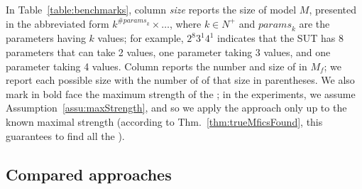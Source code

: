 \begin{tikzborder}{\cite{Gargantini16:validation}}
\begin{tikzborder}{\cite{gargantini_combinatorial_2017}}
\begin{tikzborder}{\cite{gargantini_combinatorial_2017}}
\begin{tikzborder}{\cite{garn2019}}
\begin{tikzborder}{\cite{arcaini2019achieving}}
\begin{tikzborder}{}
In Table~\ref{table:benchmarks}, column \textit{size} reports the size of model $M$, presented in the abbreviated form $k^{\# \mathit{params}_k} \times \ldots$, where $k$$\in$$N^+$ and $\mathit{params}_k$ are the parameters having $k$ values; for example, $2^8$$3^1$$4^1$ indicates that the SUT has 8 parameters that can take 2 values, one parameter taking 3 values, and one parameter taking 4 values. Column \trueMficsSet reports the number and size of \truemfics in $M_f$; we report each possible size with the number of \mfics of that size in parentheses. We also mark in bold face the maximum strength of the \truemfic; in the experiments, we assume Assumption~\ref{assu:maxStrength}, and so we apply the approach only up to the known maximal strength (according to Thm.~\ref{thm:trueMficsFound}, this guarantees to find all the \mfics).
\end{tikzborder}

\subsection{Compared approaches}\label{sec:processes}


\end{tikzborder}
\end{tikzborder}
\end{tikzborder}
\end{tikzborder}
\end{tikzborder}
